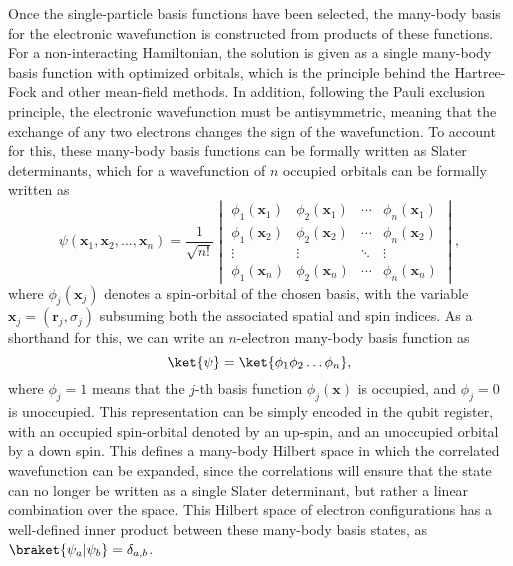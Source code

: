 Once the single-particle basis functions have been selected, the many-body basis for the electronic wavefunction is constructed from products of these functions. For a non-interacting Hamiltonian, the solution is given as a single many-body basis function with optimized orbitals, which is the principle behind the Hartree-Fock and other mean-field methods. 
In addition, following the Pauli exclusion principle, the electronic wavefunction must be antisymmetric, meaning that the exchange of any two electrons changes the sign of the wavefunction. 
To account for this, these many-body basis functions can be formally written as Slater determinants, which for a wavefunction of $n$ occupied orbitals can be formally written as
\begin{equation}
 \psi(\mathbf{x}_1, \mathbf{x}_2, \ldots, \mathbf{x}_n) =
  \frac{1}{\sqrt{n!}}
  \begin{vmatrix} \phi_1(\mathbf{x}_1) & \phi_2(\mathbf{x}_1) & \cdots & \phi_n(\mathbf{x}_1) \\
                      \phi_1(\mathbf{x}_2) & \phi_2(\mathbf{x}_2) & \cdots & \phi_n(\mathbf{x}_2) \\
                      \vdots & \vdots & \ddots & \vdots \\
                      \phi_1(\mathbf{x}_n) & \phi_2(\mathbf{x}_n) & \cdots & \phi_n(\mathbf{x}_n)
  \end{vmatrix} ,
\label{eq:slaterdeterminant}
\end{equation}
where $\phi_j(\mathbf{x}_j)$ denotes a spin-orbital of the chosen basis, with the variable $\mathbf{x}_j = (\mathbf{r}_j, \sigma_j)$ subsuming both the associated spatial and spin indices. As a shorthand for this, we can write an $n$-electron many-body basis function as
\begin{equation} \label{eq:slaterdeterminant_wf}
    \ket{\mathbf{\psi}} = \ket{\phi_{1} \phi_{2} \ldots \phi_{n}},
\end{equation}
where $\phi_j = 1$ means that the $j$-th basis function $\phi_j(\mathbf{x})$ is occupied, and $\phi_j = 0$ is unoccupied. This representation can be simply encoded in the qubit register, with an occupied spin-orbital denoted by an up-spin, and an unoccupied orbital by a down spin. This defines a many-body Hilbert space in which the correlated wavefunction can be expanded, since the correlations will ensure that the state can no longer be written as a single Slater determinant, but rather a linear combination over the space. This Hilbert space of electron configurations has a well-defined inner product between these many-body basis states, as $\braket{\mathbf{\psi}_a | \mathbf{\psi}_b} = \delta_{a,b}$.

